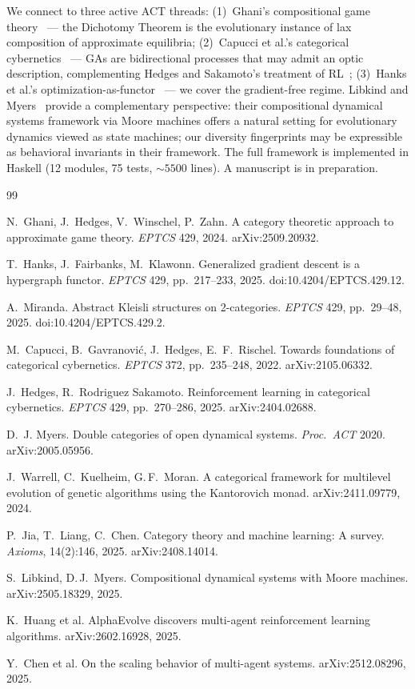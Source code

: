 \documentclass[10pt]{article}
\begin{document}
We connect to three active ACT threads: (1)~Ghani's compositional game theory~\cite{ghani2024} --- the Dichotomy Theorem is the evolutionary instance of lax composition of approximate equilibria; (2)~Capucci et al.'s categorical cybernetics~\cite{capucci2022} --- GAs are bidirectional processes that may admit an optic description, complementing Hedges and Sakamoto's treatment of RL~\cite{hedges2024}; (3)~Hanks et al.'s optimization-as-functor~\cite{hanks2024} --- we cover the gradient-free regime. Libkind and Myers~\cite{libkind2025} provide a complementary perspective: their compositional dynamical systems framework via Moore machines offers a natural setting for evolutionary dynamics viewed as state machines; our diversity fingerprints may be expressible as behavioral invariants in their framework. The full framework is implemented in Haskell (12 modules, 75 tests, ${\sim}5500$ lines). A manuscript is in preparation.

\begin{thebibliography}{99}
\small
\setlength{\itemsep}{0pt}

N.~Ghani, J.~Hedges, V.~Winschel, P.~Zahn. A category theoretic approach to approximate game theory. \emph{EPTCS} 429, 2024. arXiv:2509.20932.

T.~Hanks, J.~Fairbanks, M.~Klawonn. Generalized gradient descent is a hypergraph functor. \emph{EPTCS} 429, pp.~217--233, 2025. doi:10.4204/EPTCS.429.12.

A.~Miranda. Abstract Kleisli structures on 2-categories. \emph{EPTCS} 429, pp.~29--48, 2025. doi:10.4204/EPTCS.429.2.

M.~Capucci, B.~Gavranovi\'c, J.~Hedges, E.~F.~Rischel. Towards foundations of categorical cybernetics. \emph{EPTCS} 372, pp.~235--248, 2022. arXiv:2105.06332.

J.~Hedges, R.~Rodriguez Sakamoto. Reinforcement learning in categorical cybernetics. \emph{EPTCS} 429, pp.~270--286, 2025. arXiv:2404.02688.

D.~J. Myers. Double categories of open dynamical systems. \emph{Proc.\ ACT} 2020. arXiv:2005.05956.

J.~Warrell, C.~Kuelheim, G.\,F.~Moran. A categorical framework for multilevel evolution of genetic algorithms using the Kantorovich monad. arXiv:2411.09779, 2024.

P.~Jia, T.~Liang, C.~Chen. Category theory and machine learning: A survey. \emph{Axioms}, 14(2):146, 2025. arXiv:2408.14014.

S.~Libkind, D.\,J.~Myers. Compositional dynamical systems with Moore machines. arXiv:2505.18329, 2025.

K.~Huang et al. AlphaEvolve discovers multi-agent reinforcement learning algorithms. arXiv:2602.16928, 2025.

Y.~Chen et al. On the scaling behavior of multi-agent systems. arXiv:2512.08296, 2025.

\end{thebibliography}
\end{document}
